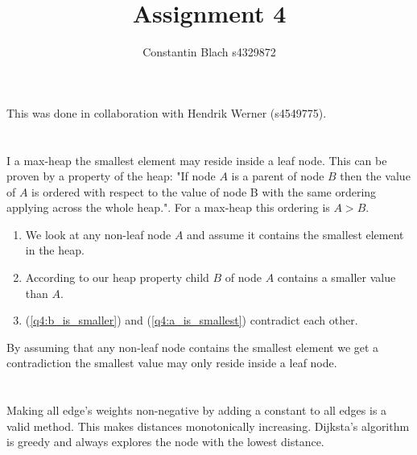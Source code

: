 \documentclass[12pt]{article}
\title {Assignment 4}
\author {Constantin Blach s4329872}
\begin{document}
\maketitle

This was done in collaboration with Hendrik Werner (s4549775).

\section{} %
\section{} %
\section{} %
\section{} %
I a max-heap the smallest element may reside inside a leaf node. This can be proven by a property of the heap: "If node $A$ is a parent of node $B$ then the value of $A$ is ordered with respect to the value of node B with the same ordering applying across the whole heap.". For a max-heap this ordering is $A > B$.

\begin{enumerate}
	\item \label{q4:a_is_smallest}
	We look at any non-leaf node $A$ and assume it contains the smallest element in the heap.
	\item \label{q4:b_is_smaller}
	According to our heap property child $B$ of node $A$ contains a smaller value than $A$.
	\item
	(\ref{q4:b_is_smaller}) and (\ref{q4:a_is_smallest}) contradict each other.
\end{enumerate}

By assuming that any non-leaf node contains the smallest element we get a contradiction the smallest value may only reside inside a leaf node.

\section{} %
\section{} %
Making all edge's weights non-negative by adding a constant to all edges is a valid method. This makes distances monotonically increasing. Dijksta's algorithm is greedy and always explores the node with the lowest distance.
\end{document}
